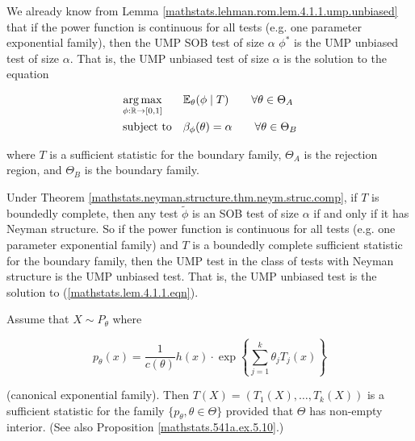 \begin{remark}\label{mathstats.neyman.structure.suff.ump.unbiased}

We already know from Lemma \ref{mathstats.lehman.rom.lem.4.1.1.ump.unbiased} that if the power function is continuous for all tests (e.g. one parameter exponential family), then the UMP SOB test of size \(\alpha\) \(\phi^*\) is the UMP unbiased test of size \(\alpha\). That is, the UMP unbiased test of size \(\alpha\) is the solution to the equation

\begin{equation}\label{mathstats.lem.4.1.1.eqn}
\begin{aligned}
& \underset{\phi:\mathbb{R} \to [0,1]}{\arg \max}
& & \E_\theta( \phi \mid T) \qquad \forall \theta \in \Theta_A \\
& \text{subject to}
& & \beta_\phi(\theta) = \alpha \qquad  \forall \theta \in \Theta_B
\end{aligned}
\end{equation}

where \(T\) is a sufficient statistic for the boundary family, \(\Theta_A\) is the rejection region, and \(\Theta_B\) is the boundary family.

Under Theorem \ref{mathstats.neyman.structure.thm.neym.struc.comp}, if \(T\) is boundedly complete, then any test \(\tilde{\phi}\) is an SOB test of size \(\alpha\) if and only if it has Neyman structure. So if the power function is continuous for all tests (e.g. one parameter exponential family) and \(T\) is a boundedly complete sufficient statistic for the boundary family, then the UMP test in the class of tests with Neyman structure is the UMP unbiased test. That is, the UMP unbiased test is the solution to (\ref{mathstats.lem.4.1.1.eqn}).

\end{remark}

\begin{theorem}\label{mathstats.541a.ex.5.10.thm}

Assume that \(X \sim P_\theta\) where 

\[
p_\theta(x) = \frac{1}{c(\theta)} h(x) \cdot \exp \left\{  \sum_{j=1}^k \theta_j T_j(x) \right\} 
\]

(canonical exponential family). Then \(T(X) = (T_1(X), \ldots, T_k(X))\) is a sufficient statistic for the family \(\{p_\theta, \theta \in \Theta\}\) provided that \(\Theta\) has non-empty interior. (See also Proposition \ref{mathstats.541a.ex.5.10}.)

\end{theorem}


